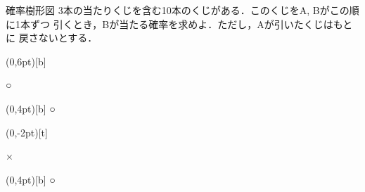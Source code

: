 \begin{itemsquarebox}{確率樹形図}
3本の当たりくじを含む10本のくじがある．このくじをA, Bがこの順に1本ずつ
引くとき，Bが当たる確率を求めよ．ただし，Aが引いたくじはもとに
戻さないとする．
\end{itemsquarebox}
{%

\hspace{5zw}
\begin{zyukeizu}%
\eda[$\frac{3}{10}$](0,6pt)[b]{ ○ %
	\begin{zyukeizu}%
	\eda[$\frac29$](0,4pt)[b]{ ○ }%
	\end{zyukeizu}%
}%
\eda[$\frac{7}{10}$](0,-2pt)[t]{ × %
	\begin{zyukeizu}%
	\eda[$\frac39$](0,4pt)[b]{ ○ }%
	\eda[$\frac69$][t]{ × }%
	\end{zyukeizu}%
}%
\end{zyukeizu}%
}
